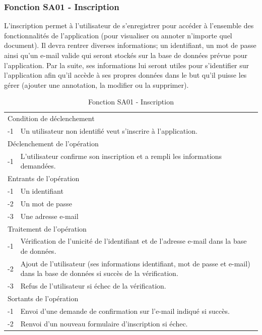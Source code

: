 \documentclass[a4paper]{article}
\begin{document}
\subsubsection{Fonction SA01 - Inscription}

L’inscription permet à l’utilisateur de s’enregistrer pour accéder à l’ensemble des fonctionnalités de l’application (pour visualiser ou annoter n’importe quel document). Il devra rentrer diverses informations; un identifiant, un mot de passe ainsi qu’un e-mail valide qui seront stockés sur la base de données prévue pour l’application. Par la suite, ses informations lui seront utiles pour s’identifier sur l’application afin qu’il accède à ses propres données dans le but qu’il puisse les gérer (ajouter une annotation, la modifier ou la supprimer).
    
\begin{table}[H]
  \centering
   \small
	\begin{tabular}{|c|p{12cm}|}
   		\hline
   			\rowcolor{lightgray}\multicolumn{2}{|c|}{\textbf{Fonction SA01 - Inscription}} \\
   		\hline
   			\multicolumn{2}{|l|}{Condition de déclenchement} \\
   		\hline
   			-1 & Un utilisateur non identifié veut s'inscrire à l'application.\\
   		\hline
   			\multicolumn{2}{|l|}{Déclenchement de l'opération} \\
   		\hline
   			-1 & L'utilisateur confirme son inscription et a rempli les informations demandées.\\
   		\hline
   			\multicolumn{2}{|l|}{Entrants de l'opération} \\
   		\hline
   			-1 & Un identifiant\\
        	-2 & Un mot de passe\\ 
        	-3 & Une adresse e-mail\\ 
   		\hline
   			\multicolumn{2}{|l|}{Traitement de l'opération} \\
  		\hline
   			-1 & Vérification de l'unicité de l'identifiant et de l'adresse e-mail dans la base de données.\\
        	-2 & Ajout de l'utilisateur (ses informations identifiant, mot de passe et e-mail) dans la base de données si succès de la vérification.\\
        	-3 & Refus de l'utilisateur si échec de la vérification.\\
   		\hline
   			\multicolumn{2}{|l|}{Sortants de l'opération} \\
   		\hline
   			-1 & Envoi d'une demande de confirmation sur l'e-mail indiqué si succès.\\
            -2 & Renvoi d'un nouveau formulaire d'inscription si échec.\\
   		\hline
	\end{tabular}
  \caption{Fonction SA01 - Inscription}
  \normalsize
  \label{tab: inscription}
\end{table}
    
\end{document}
